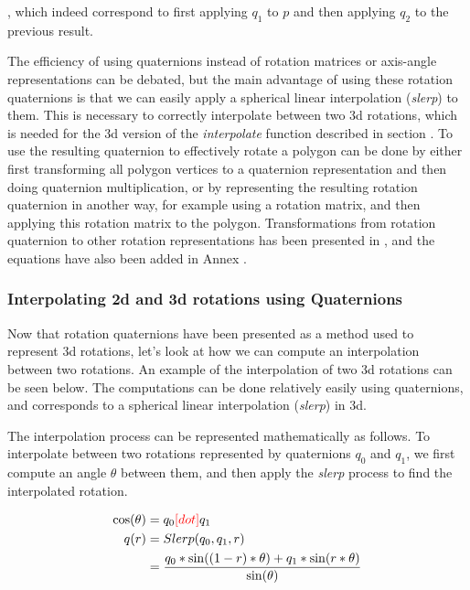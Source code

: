 		, which indeed correspond to first applying \( q_1 \) to \( p \) and then applying \( q_2 \) to the previous result.
		
		The efficiency of using quaternions instead of rotation matrices or axis-angle representations can be debated, but the main advantage of using these rotation quaternions is that we can easily apply a spherical linear interpolation (\textit{slerp}) to them. This is necessary to correctly interpolate between two 3d rotations, which is needed for the 3d version of the \textit{interpolate} function described in section . To use the resulting quaternion to effectively rotate a polygon can be done by either first transforming all polygon vertices to a quaternion representation and then doing quaternion multiplication, or by representing the resulting rotation quaternion in another way, for example using a rotation matrix, and then applying this rotation matrix to the polygon. Transformations from rotation quaternion to other rotation representations has been presented in \cite{ISO19141}, and the equations have also been added in Annex .
			
		\subsubsection{Interpolating 2d and 3d rotations using Quaternions}
		
		Now that rotation quaternions have been presented as a method used to represent 3d rotations, let's look at how we can compute an interpolation between two rotations. An example of the interpolation of two 3d rotations can be seen below.  The computations can be done relatively easily using quaternions, and corresponds to a spherical linear interpolation (\textit{slerp}) in 3d.
		
		The interpolation process can be represented mathematically as follows. To interpolate between two rotations represented by quaternions \( q_0 \) and \( q_1 \), we first compute an angle \( \theta \) between them, and then apply the \textit{slerp} process to find the interpolated rotation.
		
		\begin{equation}
		\begin{split}
			\cos(\theta) 	& = q_0 \textcolor{red}{[dot]} q_1 \\
			q(r) 			& = Slerp(q_0, q_1, r) \\
							& = \frac{q_0 * \sin((1-r)*\theta) + q_1 * \sin(r*\theta)}{\sin(\theta)}
		\end{split}
		\end{equation}
			
